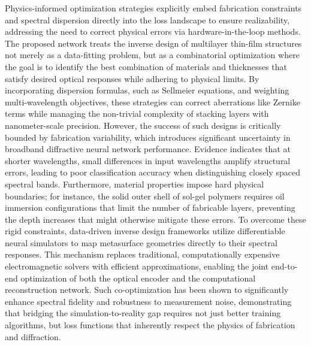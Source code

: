 \documentclass[11pt]{article}
\begin{document}
Physics-informed optimization strategies explicitly embed fabrication constraints and spectral dispersion directly into the loss landscape to ensure realizability, addressing the need to correct physical errors via hardware-in-the-loop methods. The proposed network treats the inverse design of multilayer thin-film structures not merely as a data-fitting problem, but as a combinatorial optimization where the goal is to identify the best combination of materials and thicknesses that satisfy desired optical responses while adhering to physical limits. By incorporating dispersion formulas, such as Sellmeier equations, and weighting multi-wavelength objectives, these strategies can correct aberrations like Zernike terms while managing the non-trivial complexity of stacking layers with nanometer-scale precision. However, the success of such designs is critically bounded by fabrication variability, which introduces significant uncertainty in broadband diffractive neural network performance. Evidence indicates that at shorter wavelengths, small differences in input wavelengths amplify structural errors, leading to poor classification accuracy when distinguishing closely spaced spectral bands. Furthermore, material properties impose hard physical boundaries; for instance, the solid outer shell of sol-gel polymers requires oil immersion configurations that limit the number of fabricable layers, preventing the depth increases that might otherwise mitigate these errors. To overcome these rigid constraints, data-driven inverse design frameworks utilize differentiable neural simulators to map metasurface geometries directly to their spectral responses. This mechanism replaces traditional, computationally expensive electromagnetic solvers with efficient approximations, enabling the joint end-to-end optimization of both the optical encoder and the computational reconstruction network. \citep{s2_76a83ea3baed75ad88b7f0782eb9a694a330c853_cee16cac} \citep{doi_10_1002_admt_202401999_652aff4b} Such co-optimization has been shown to significantly enhance spectral fidelity and robustness to measurement noise, demonstrating that bridging the simulation-to-reality gap requires not just better training algorithms, but loss functions that inherently respect the physics of fabrication and diffraction. \citep{doi_10_1016_j_isci_2025_112222_1f7c10f5} \citep{doi_10_1002_adpr_202300310_6647aa64} \citep{s2_76a83ea3baed75ad88b7f0782eb9a694a330c853_cee16cac}
\end{document}
